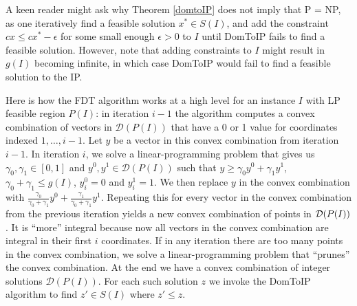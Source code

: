 A keen reader might ask why Theorem \ref{domtoIP} does not imply that P = NP, as one iteratively find a feasible solution $x^*\in S(I)$, and add the constraint $cx\leq cx^*-\epsilon$ for some small enough $\epsilon>0$ to $I$ until DomToIP fails to find a feasible solution. However, note that adding constraints to $I$ might result in $g(I)$ becoming infinite, in which case DomToIP would fail to find a feasible solution to the IP. 



Here is how the FDT algorithm works at a high level for an instance $I$ with LP feasible region $P(I)$: in iteration $i-1$ the algorithm computes a convex combination of vectors in $\mathcal{D}(P(I))$ that have a 0 or 1 value for coordinates indexed $1,\ldots,i-1$. Let $y$ be a vector in this convex combination from iteration $i-1$. In iteration $i$, we solve a linear-programming problem that gives us $\gamma_0,\gamma_1\in [0,1]$ and $y^0,y^1\in \mathcal{D}(P(I))$ such that $y\geq \gamma_0 y^0 + \gamma_1 y^1$, $\gamma_0+\gamma_1\leq g(I)$, $y^0_i=0$ and $y^1_i=1$. We then replace $y$ in the convex combination with $\frac{\gamma_0}{\gamma_0+\gamma_1}y^0 +\frac{\gamma_1}{\gamma_0+\gamma_1}y^1$.  Repeating this for every vector in the convex combination from the previous iteration yields a new convex combination of points in $\operatorname{\mathcal{D}}(P(I))$. It is ``more'' integral because now all vectors in the convex combination are integral in their first $i$ coordinates. If in any iteration there are too many points in the convex combination,  we solve a linear-programming problem that ``prunes'' the convex combination. At the end we have a convex combination of integer solutions $\mathcal{D}(P(I))$. For each such solution $z$ we invoke the DomToIP algorithm
to find $z'\in S(I)$ where $z'\leq z$.


